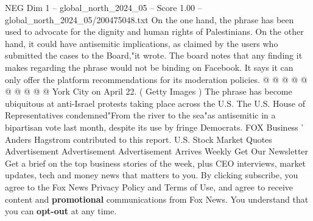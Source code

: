 \begin{textsample}{NEG Dim 1 – global\_north\_2024\_05 – Score 1.00 – global\_north\_2024\_05/200475048.txt}
On the one hand, the phrase has been used to advocate for the dignity and human rights of Palestinians.
On the other hand, it could have antisemitic implications, as claimed by the users who submitted the cases to the Board,"it wrote.
The board notes that any finding it makes regarding the phrase would not be binding on Facebook.
It says it can only offer the platform recommendations for its moderation policies. @ @ @ @ @ @ @ @ @ @ York City on April 22. ( Getty Images ) The phrase has become ubiquitous at anti-Israel protests taking place across the U.S.
The U.S.
House of Representatives condemned"From the river to the sea"as antisemitic in a bipartisan vote last month, despite its use by fringe Democrats.
FOX Business ' Anders Hagstrom contributed to this report.
U.S.
Stock Market Quotes Advertisement Advertisement Advertisement Arrives Weekly Get Our Newsletter Get a brief on the top business stories of the week, plus CEO interviews, market updates, tech and money news that matters to you.
By clicking subscribe, you agree to the Fox News Privacy Policy and Terms of Use, and agree to receive content and \textbf{promotional} communications from Fox News.
You understand that you can \textbf{opt-out} at any time.

\end{textsample}

